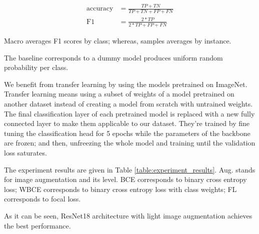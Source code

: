 \documentclass[conference]{IEEEtran}
\begin{document}
\begin{align*}
    \text{accuracy} &= \frac{TP+TN}{TP+TN+FP+FN} \\
    \text{F1} &= \frac{2*TP}{2*TP+FP+FN}
\end{align*}

Macro averages F1 scores by class; whereas, samples averages by instance.


The baseline corresponds to a dummy model produces uniform random probability per class. 

We benefit from transfer learning by using the models pretrained on ImageNet. Transfer learning
means using a subset of weights of a model pretrained on another dataset instead of 
creating a model from scratch with untrained weights.
The final classification layer of each pretrained model is replaced with a new fully connected layer to make them applicable to our dataset. 
They're trained by fine tuning the classification head for 5 epochs while the parameters 
of the backbone are frozen; and then,
unfreezing the whole model and training until the validation loss saturates.

The experiment results are given in Table \ref{table:experiment_results}. 
Aug. stands for image augmentation and its level. 
BCE corresponds to binary cross entropy loss; WBCE corresponds to binary cross entropy loss with 
class weights; FL corresponds to focal loss.

As it can be seen, ResNet18 architecture with light image augmentation achieves the best performance. 
\end{document}
